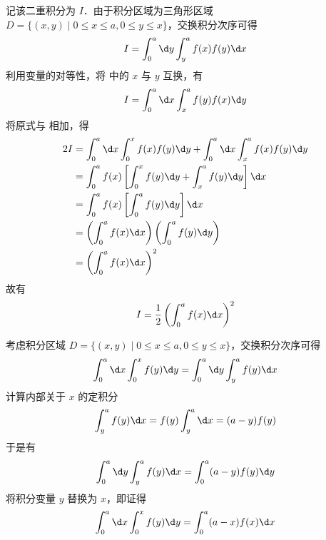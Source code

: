 \begin{myproof}

    记该二重积分为 $I$．由于积分区域为三角形区域 $D = \{ (x, y) \mid 0 \le x \le a, 0 \le y \le x \}$，交换积分次序可得
    \begin{equation}
        I = \int_0^a \d y \int_y^a f(x)f(y) \d x \label{eq:Ident-1}
    \end{equation}
    利用变量的对等性，将  中的 $x$ 与 $y$ 互换，有
    \begin{equation}
        I = \int_0^a \d x \int_x^a f(y)f(x) \d y \label{eq:Ident-2}
    \end{equation}
    将原式与  相加，得
    \begin{equation}
        \begin{aligned}
            2I & = \int_0^a \d x \int_0^x f(x)f(y) \d y + \int_0^a \d x \int_x^a f(x)f(y) \d y \\
               & = \int_0^a f(x) \left[ \int_0^x f(y) \d y + \int_x^a f(y) \d y \right] \d x   \\
               & = \int_0^a f(x) \left[ \int_0^a f(y) \d y \right] \d x                        \\
               & = \left( \int_0^a f(x) \d x \right) \left( \int_0^a f(y) \d y \right)         \\
               & = \left( \int_0^a f(x) \d x \right)^2
        \end{aligned}
    \end{equation}
    故有
    \begin{equation}
        I = \frac{1}{2} \left( \int_0^a f(x) \d x \right)^2
    \end{equation}


    考虑积分区域 $D = \{ (x, y) \mid 0 \le x \le a, 0 \le y \le x \}$，交换积分次序可得
    \begin{equation}
        \int_0^a \d x \int_0^x f(y) \d y = \int_0^a \d y \int_y^a f(y) \d x
    \end{equation}
    计算内部关于 $x$ 的定积分
    \begin{equation}
        \int_y^a f(y) \d x = f(y) \int_y^a \d x = (a - y)f(y)
    \end{equation}
    于是有
    \begin{equation}
        \int_0^a \d y \int_y^a f(y) \d x = \int_0^a (a - y)f(y) \d y
    \end{equation}
    将积分变量 $y$ 替换为 $x$，即证得
    \begin{equation}
        \int_0^a \d x \int_0^x f(y) \d y = \int_0^a (a - x)f(x) \d x
    \end{equation}
\end{myproof}


